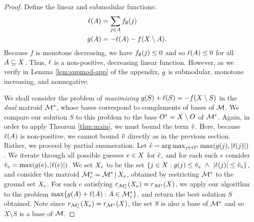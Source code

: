 \documentclass{article}
\DeclareMathOperator{\restrict}{\mid}
\theoremstyle{definition}
\begin{document}
\begin{proof}
Define the linear and submodular functions:
\begin{align*}
\ell(A) &= \sum_{j \in A}f_{\emptyset}(j) \\
g(A) &= -\ell(A) - f(X \setminus A).
\end{align*}
Because $f$ is monotone decreasing, we have $f_{\emptyset}(j) \le 0$ and so $\ell(A) \le 0$ for all $A \subseteq X$.  Thus, $\ell$ is a non-positive, decreasing linear function.  However, as we verify in Lemma \ref{lem:supmod-app} of the appendix, $g$ is submodular, monotone increasing, and nonnegative.

We shall consider the problem of \emph{maximizing} $g(S) + \ell(S) = -f(X \setminus S)$ in the \emph{dual} matroid $\mathcal{M}^{*}$, whose bases correspond to complements of bases of $\mathcal{M}$.  We compare our solution $S$ to this problem to the base $O^{*} = X \setminus O$ of $\mathcal{M}^{*}$.  Again, in order to apply Theorem \ref{thm:main}, we must bound the term $\hat{v}$.  Here, because $\ell(A)$ is non-positive, we cannot bound $\hat{v}$ directly as in the previous section.  Rather, we proceed by partial enumeration.  Let $\hat{e} = \arg\max_{j \in O^{*}}\max(g(j),|\ell(j)|)$.  We iterate through all possible guesses $e \in X$ for $\hat{e}$, and for each such $e$ consider $\hat{v}_{e} = \max(g(e),|\ell(e)|)$.  We set $X_{e}$ to be the set $\{j \in \ground : \submod(j) \le \vmax_{e}\ \land\ |\lin(j)| \le \vmax_{e} \}$, and consider the matroid $\Mdual_{e} = \Mdual \restrict \ground_{e}$, obtained by restricting $\mathcal{M}^{*}$ to the ground set $X_{e}$.  For each $e$ satisfying $r_{\mathcal{M}^{*}_{e}}(X_{e}) = r_{\mathcal{M}^{*}}(X)$, we apply our algorithm to the problem $\max\{g(A) + \ell(A) : A \in \mathcal{M}^{*}_{e}\}$, and return the best solution $S$ obtained.  Note since $r_{\mathcal{M}^{*}_{e}}(X_{e}) = r_{\mathcal{M}^{*}}(X)$, the set $S$ is also a base of $\mathcal{M}^{*}$ and so $X \setminus S$ is a base of $\mathcal{M}$.  


\end{proof}
\end{document}

